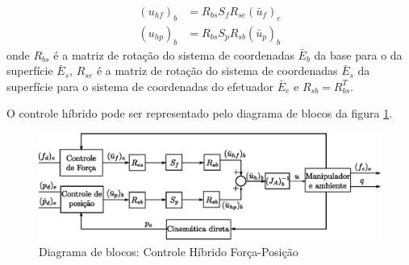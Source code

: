 \begin{align}
({u}_{hf})_b &= R_{bs} S_f R_{se} (\bar{u}_f)_e \\
({u}_{hp})_b &= R_{bs} S_p R_{sb} (\bar{u}_p)_b 
\end{align}
onde $R_{bs}$ é a matriz de rotação do sistema de coordenadas $\bar{E}_b$ da base para o da superfície $\bar{E}_s$,   $R_{se}$ é a matriz de rotação do sistema de coordenadas $\bar{E}_s$ da superfície para o sistema de coordenadas do efetuador $\bar{E}_e$ e $R_{sb} = R_{bs}^T$. 

O controle híbrido pode ser representado pelo diagrama de blocos da figura \ref{fig:hybrid_block}.

\begin{figure}[H]
  \centering
  \includegraphics[width=\linewidth]{./img/hybrid.eps}
  \caption{Diagrama de blocos: Controle Híbrido Força-Posição}
  \label{fig:hybrid_block}
\end{figure}